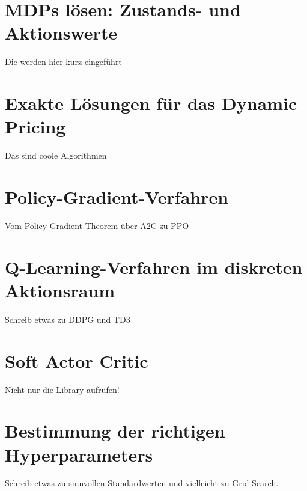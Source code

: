 \section{MDPs lösen: Zustands- und Aktionswerte}
Die werden hier kurz eingeführt

\section{Exakte Lösungen für das Dynamic Pricing}
Das sind coole Algorithmen

\section{Policy-Gradient-Verfahren}
Vom Policy-Gradient-Theorem über A2C zu PPO

\section{Q-Learning-Verfahren im diskreten Aktionsraum}
Schreib etwas zu DDPG und TD3

\section{Soft Actor Critic}
Nicht nur die Library aufrufen!

\section{Bestimmung der richtigen Hyperparameters}
Schreib etwas zu sinnvollen Standardwerten und vielleicht zu Grid-Search.

